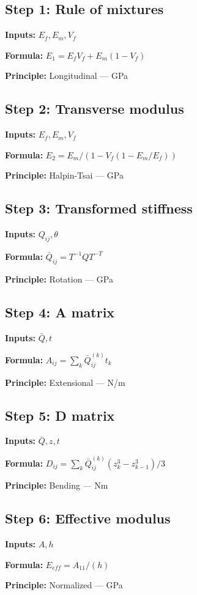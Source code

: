 \documentclass[11pt,twocolumn]{article}
\begin{document}
\subsection*{Step 1: Rule of mixtures}
\textbf{Inputs:} $E_f, E_m, V_f$

\textbf{Formula:} $E_1 = E_f V_f + E_m(1-V_f)$

\textbf{Principle:} Longitudinal --- GPa

\subsection*{Step 2: Transverse modulus}
\textbf{Inputs:} $E_f, E_m, V_f$

\textbf{Formula:} $E_2 = E_m/(1 - V_f(1-E_m/E_f))$

\textbf{Principle:} Halpin-Tsai --- GPa

\subsection*{Step 3: Transformed stiffness}
\textbf{Inputs:} $Q_{ij}, \theta$

\textbf{Formula:} $\bar{Q}_{ij} = T^{-1} Q T^{-T}$

\textbf{Principle:} Rotation --- GPa

\subsection*{Step 4: A matrix}
\textbf{Inputs:} $\bar{Q}, t$

\textbf{Formula:} $A_{ij} = \sum_k \bar{Q}_{ij}^{(k)} t_k$

\textbf{Principle:} Extensional --- N/m

\subsection*{Step 5: D matrix}
\textbf{Inputs:} $\bar{Q}, z, t$

\textbf{Formula:} $D_{ij} = \sum_k \bar{Q}_{ij}^{(k)} (z_k^3 - z_{k-1}^3)/3$

\textbf{Principle:} Bending --- Nm

\subsection*{Step 6: Effective modulus}
\textbf{Inputs:} $A, h$

\textbf{Formula:} $E_{eff} = A_{11}/(h)$

\textbf{Principle:} Normalized --- GPa
\end{document}
